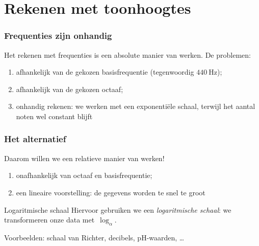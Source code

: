 \documentclass[compress, darktitle, framenumber, handout, totalframenumber]{beamer}
\begin{document}
\section{Rekenen met toonhoogtes}

\begin{frame}
  \frametitle{Frequenties zijn onhandig}

  Het rekenen met frequenties is een \alert{absolute} manier van werken. \pause De problemen:
  \begin{enumerate}
    \item afhankelijk van de gekozen basisfrequentie (tegenwoordig $\SI{440}{\hertz}$);
    \item afhankelijk van de gekozen octaaf;
    \item onhandig rekenen: we werken met een \alert{exponenti\"ele schaal}, terwijl het aantal noten wel constant blijft
  \end{enumerate}
  \begin{center}
  \end{center}
\end{frame}

\begin{frame}
  \frametitle{Het alternatief}
  
  Daarom willen we een \alert{relatieve} manier van werken!
  \begin{enumerate}
    \item onafhankelijk van octaaf en basisfrequentie;
    \item een \alert{lineaire} voorstelling: de gegevens worden te snel te groot
  \end{enumerate}
  \begin{center}
  \end{center}
  \pause
  \begin{block}{Logaritmische schaal}
    Hiervoor gebruiken we een \emph{logaritmische schaal}: we transformeren onze data met~$\log_\alpha$.
  \end{block}
  Voorbeelden: schaal van Richter, decibels, pH-waarden, \ldots
\end{frame}
\end{document}
